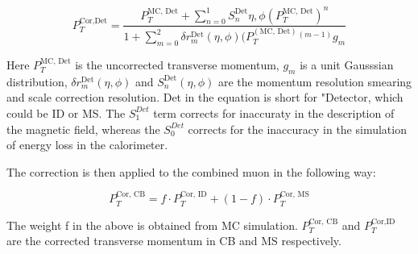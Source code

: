 
\begin{equation}
    P_{T}^{\textrm{Cor,Det}} = \frac{P^{\textrm{MC, Det}}_{T} + \sum_{n=0}^{1} S_{n}^{\textrm{Det}}{\eta, \phi}(P_{T}^\textrm{{MC, Det}})^n}{1+\sum_{m=0}^{2}\delta r_{m}^{\textrm{Det}}(\eta, \phi)(P_{T}^({\textrm{MC, Det}})^{(m-1)} g_{m}}
\label{eq:muoncalib}
\end{equation}

Here $P_{T}^{\textrm{MC, Det}}$ is the uncorrected transverse momentum, $g_m$ is a unit Gausssian distribution, $\delta r^{\textrm{Det}}_{m}(\eta, \phi)$ and $S_{n}^{\textrm{Det}}(\eta, \phi)$ are the momentum resolution smearing and scale correction resolution. Det in the equation is short for "Detector, which could be ID or MS. The $S^{Det}_{1}$ term corrects for inaccuraty in the description of the magnetic field, whereas the $S^{Det}_{0}$ corrects for the inaccuracy in the simulation of energy loss in the calorimeter.

The correction is then applied to the combined muon in the following way:

\begin{equation}
    P_{T}^{\textrm{Cor, CB}} = f \cdot P_{T}^{\textrm{Cor, ID}}+ (1-f) \cdot P_{T}^{\textrm{Cor, MS}}
\label{eq:muoncalibfactor}
\end{equation}

The weight f in the above is obtained from MC simulation. $P_T^{\textrm{Cor, CB}}$ and $P_T^{\textrm{Cor,ID}}$ are the corrected transverse momentum in CB and MS respectively.





